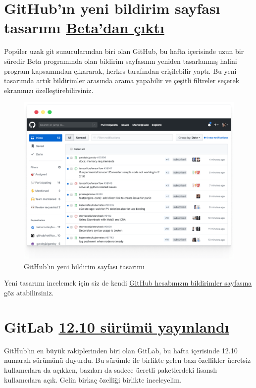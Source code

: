 \documentclass[11pt]{article}
\begin{document}
\section{GitHub'ın yeni bildirim sayfası tasarımı \href{https://github.blog/2020-04-22-improving-notifications-for-everyone/}{Beta'dan çıktı}}
\label{sec:org36abec8}
Popüler uzak git sunucularından biri olan GitHub, bu hafta içerisinde uzun bir
süredir Beta programında olan bildirim sayfasının yeniden tasarlanmış halini
program kapsamından çıkararak, herkes tarafından erişilebilir yaptı. Bu yeni
tasarımda artık bildirimler arasında arama yapabilir ve çeşitli filtreler
seçerek ekranınızı özelleştirebilirsiniz.

\begin{figure}[htbp]
\centering
\includegraphics[width=.9\linewidth]{gorseller/github-bildirimler-yeni.png}
\caption{GitHub'ın yeni bildirim sayfası tasarımı}
\end{figure}

Yeni tasarımı incelemek için siz de kendi \href{https://github.com/notifications}{GitHub hesabınızın bildirimler
sayfasına} göz atabilirsiniz.
\section{GitLab \href{https://about.gitlab.com/releases/2020/04/22/gitlab-12-10-released/}{12.10 sürümü yayınlandı}}
\label{sec:org7d5e4c9}
GitHub'ın en büyük rakiplerinden biri olan GitLab, bu hafta içerisinde 12.10
numaralı sürümünü duyurdu. Bu sürümle ile birlikte gelen bazı özellikler
ücretsiz kullanıcılara da açıkken, bazıları da sadece ücretli paketlerdeki
lisanslı kullanıcılara açık. Gelin birkaç özelliği birlikte inceleyelim.
\end{document}
